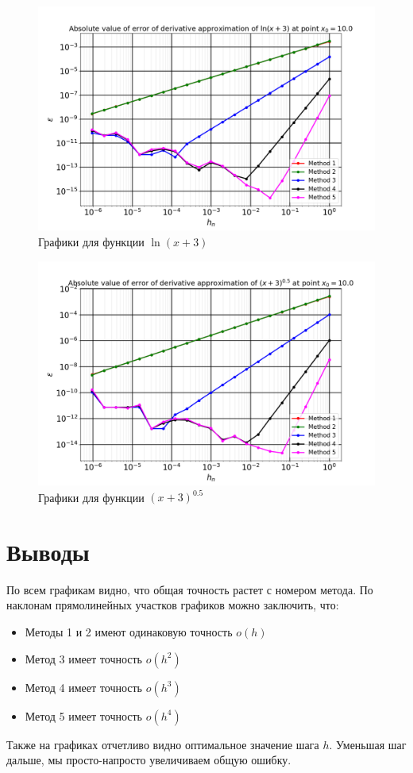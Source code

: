 		\newpage
		\begin{figure}[h!]
			\centering
			\includegraphics[width=\linewidth]{./Pictures/Function_4.png}
			\caption{Графики для функции $\ln(x + 3)$}
		\end{figure}
		
		\begin{figure}[h!]
			\centering
			\includegraphics[width=\linewidth]{./Pictures/Function_5.png}
			\caption{Графики для функции $(x + 3)^{0.5}$}
		\end{figure}
 		
 		
 		\section*{Выводы}
 		
 		По всем графикам видно, что общая точность растет с номером метода. По наклонам прямолинейных участков графиков можно заключить, что:
 		\begin{itemize}
 			\item Методы 1 и 2 имеют одинаковую точность $o(h)$
 			\item Метод 3 имеет точность $o(h^2)$
 			\item Метод 4 имеет точность $o(h^3)$
 			\item Метод 5 имеет точность $o(h^4)$
 		\end{itemize}
 	
 		Также на графиках отчетливо видно оптимальное значение шага $h$. Уменьшая шаг дальше, мы просто-напросто увеличиваем общую ошибку.
 		
